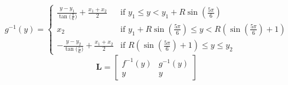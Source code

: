 		\begin{equation}
		\label{eq:hexagon_right_intersection}
			g^{-1}(y) = 
			\begin{cases} 
				\frac{y - y_1}{\tan{(\frac{\pi}{6}})} + \frac{x_1 + x_2}{2} & \text{if } y_1 \le y < y_1 + R\sin{(\frac{5\pi}{6})} \\
				x_2 & \text{if } y_1 + R\sin{(\frac{5\pi}{6})} \le y < R(\sin{(\frac{5\pi}{6})} + 1) \\
				-\frac{y - y_2}{\tan{(\frac{\pi}{6}})} + \frac{x_1 + x_2}{2} & \text{if } R(\sin{(\frac{5\pi}{6})} + 1) \le y \le y_2
			\end{cases}
		\end{equation}
		\begin{equation}
		\label{eq:hexagon_split_line}
			\mathbf{L} =
			\begin{bmatrix}
				f^{-1}(y) & g^{-1}(y) \\
				y & y
			\end{bmatrix}
		\end{equation}
